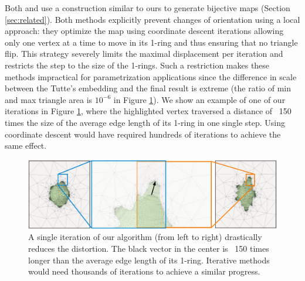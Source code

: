Both \cite{Zhang:2005} and \cite{Misztal:2012} use a construction similar to ours to generate bijective maps (Section \ref{sec:related}). Both methods explicitly prevent changes of orientation using a local approach: they optimize the map using coordinate descent iterations \cite{SolomonBook} allowing only one vertex at a time to move in its 1-ring and thus ensuring that no triangle flip. This strategy severely limits the maximal displacement per iteration and restricts the step to the size of the 1-rings. Such a restriction makes these methods impractical for parametrization applications since the difference in scale between the Tutte's embedding and the final result is extreme (the ratio of min and max triangle area is $10^{-6}$ in Figure \ref{scaf:fig:largestep}). We show an example of one of our iterations in Figure \ref{scaf:fig:largestep}, where the highlighted vertex traversed a distance of ~150 times the size of the average edge length of its 1-ring in one single step. Using coordinate descent would have required hundreds of iterations to achieve the same effect. 

\begin{figure}[t]
\includegraphics[width=\columnwidth]{scaf-tex/figs/camel_step.pdf}
\caption{A single iteration of our algorithm (from left to right) drastically reduces the distortion. The black vector in the center is ~150 times longer than the average edge length of its 1-ring. Iterative methods would need thousands of iterations to achieve a similar progress.}
\vspace{-0.3cm}
\label{scaf:fig:largestep}
\end{figure}

